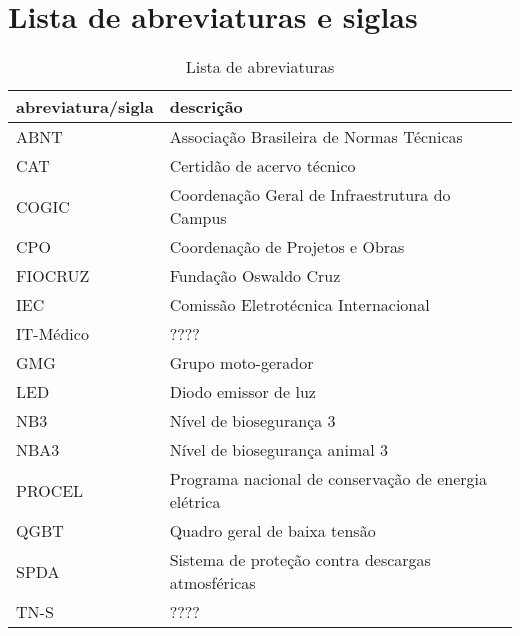 \section*{Lista de abreviaturas e siglas} \label{section: abbreviations}

\begin{table}[ht]
\centering
\caption{Lista de abreviaturas}
\begin{tabular}[t]
{m{}m{}}
\toprule
\textbf{abreviatura/sigla}&\textbf{descrição}\\
\midrule
ABNT & Associação Brasileira de Normas Técnicas\\
CAT & Certidão de acervo técnico\\
COGIC & Coordenação Geral de Infraestrutura do Campus\\
CPO & Coordenação de Projetos e Obras\\
FIOCRUZ & Fundação Oswaldo Cruz\\
IEC & Comissão Eletrotécnica Internacional\\
IT-Médico & ????\\
GMG & Grupo moto-gerador \\
LED & Diodo emissor de luz \\
NB3 & Nível de biosegurança 3\\
NBA3 & Nível de biosegurança animal 3\\
PROCEL & Programa nacional de conservação de energia elétrica\\
QGBT & Quadro geral de baixa tensão\\
SPDA & Sistema de proteção contra descargas atmosféricas\\
TN-S & ????\\
\bottomrule
\end{tabular}
\end{table}